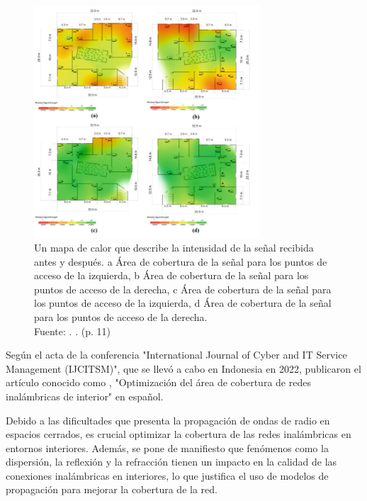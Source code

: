 \begin{figure}[!ht]
	\begin{center}
		\includegraphics[width=0.75\textwidth]{2/figures/alathari2023.png}
		\caption[Un mapa de calor que describe la intensidad de la señal recibida antes y después. a Área de cobertura de la señal para los puntos de acceso de la izquierda, b Área de cobertura de la señal para los puntos de acceso de la derecha, c Área de cobertura de la señal para los puntos de acceso de la izquierda, d Área de cobertura de la señal para los puntos de acceso de la derecha.]{Un mapa de calor que describe la intensidad de la señal recibida antes y después. a Área de cobertura de la señal para los puntos de acceso de la izquierda, b Área de cobertura de la señal para los puntos de acceso de la derecha, c Área de cobertura de la señal para los puntos de acceso de la izquierda, d Área de cobertura de la señal para los puntos de acceso de la derecha.\\
		Fuente: \cite{pr_alathari2023optaps}. . (p. 11)}
		\label{2:fig113}
	\end{center}
\end{figure}

\clearpage
Según el acta de la conferencia "International Journal of Cyber and IT Service Management (IJCITSM)", que se llevó a cabo en Indonesia en 2022, \cite{pr_dudhat2022indoorwir} publicaron el artículo conocido como , "Optimización del área de cobertura de redes inalámbricas de interior" en español.

Debido a las dificultades que presenta la propagación de ondas de radio en espacios cerrados, es crucial optimizar la cobertura de las redes inalámbricas en entornos interiores. Además, se pone de manifiesto que fenómenos como la dispersión, la reflexión y la refracción tienen un impacto en la calidad de las conexiones inalámbricas en interiores, lo que justifica el uso de modelos de propagación para mejorar la cobertura de la red.

